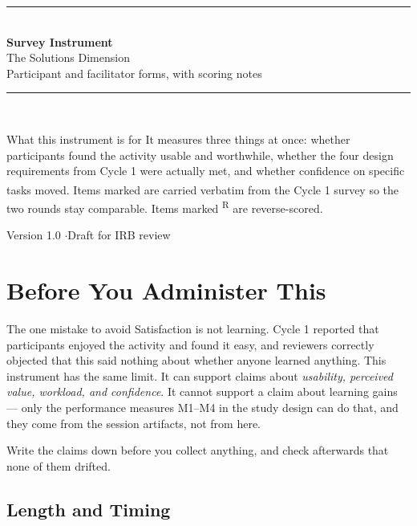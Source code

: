 \documentclass[11pt,letterpaper]{article}
\newcommand{\R}{\textsuperscript{R}}
\newcommand{\anchor}{\textsuperscript{\dag}}
\begin{document}
\begin{titlepage}
\centering
\vspace*{2.4cm}
{\color{deep}\rule{\textwidth}{2pt}}\\[0.8em]
{\Huge\bfseries\color{deep} Survey Instrument}\\[0.6em]
{\LARGE The Solutions Dimension}\\[0.4em]
{\large Participant and facilitator forms, with scoring notes}\\[0.5em]
{\color{deep}\rule{\textwidth}{2pt}}\\[2.4cm]
\begin{minipage}{0.84\textwidth}
\begin{note}{What this instrument is for}
It measures three things at once: whether participants found the activity usable
and worthwhile, whether the four design requirements from Cycle 1 were actually
met, and whether confidence on specific tasks moved. Items marked \anchor{} are
carried verbatim from the Cycle 1 survey so the two rounds stay comparable.
Items marked \R{} are reverse-scored.
\end{note}
\end{minipage}
\vfill
{\small Version 1.0 \quad$\cdot$\quad Draft for IRB review}
\end{titlepage}

\tableofcontents
\newpage

\section{Before You Administer This}

\begin{caution}{The one mistake to avoid}
Satisfaction is not learning. Cycle 1 reported that participants enjoyed the
activity and found it easy, and reviewers correctly objected that this said
nothing about whether anyone learned anything. This instrument has the same
limit. It can support claims about \emph{usability, perceived value, workload,
and confidence}. It cannot support a claim about learning gains --- only the
performance measures M1--M4 in the study design can do that, and they come from
the session artifacts, not from here.

Write the claims down before you collect anything, and check afterwards that
none of them drifted.
\end{caution}

\subsection{Length and Timing}
\end{document}
